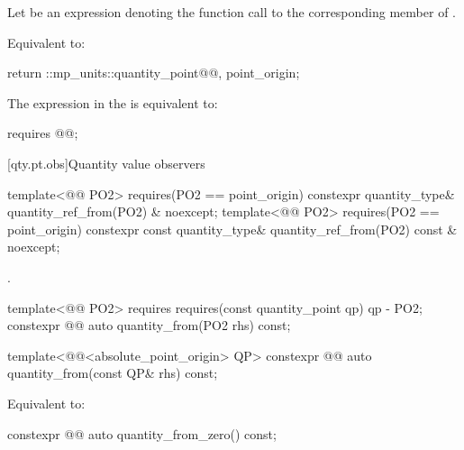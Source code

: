 \begin{itemdescr}
\pnum
Let  be an expression denoting
the function call to the corresponding member of .

\pnum
\effects
Equivalent to:
\begin{codeblock}
return ::mp_units::quantity_point{@@, point_origin};
\end{codeblock}

\pnum
\remarks
The expression in the  is equivalent to:
\begin{codeblock}
requires { @@; }
\end{codeblock}
\end{itemdescr}

[qty.pt.obs]{Quantity value observers}

\begin{itemdecl}
template<@@ PO2>
  requires(PO2{} == point_origin)
constexpr quantity_type& quantity_ref_from(PO2) & noexcept;
template<@@ PO2>
  requires(PO2{} == point_origin)
constexpr const quantity_type& quantity_ref_from(PO2) const & noexcept;
\end{itemdecl}

\begin{itemdescr}
\pnum
\returns
{}.
\end{itemdescr}

\begin{itemdecl}
template<@@ PO2>
  requires requires(const quantity_point qp) { qp - PO2{}; }
constexpr @@ auto quantity_from(PO2 rhs) const;

template<@@<absolute_point_origin> QP>
constexpr @@ auto quantity_from(const QP& rhs) const;
\end{itemdecl}

\begin{itemdescr}
\pnum
\effects
Equivalent to:
\end{itemdescr}

\begin{itemdecl}
constexpr @@ auto quantity_from_zero() const;
\end{itemdecl}

